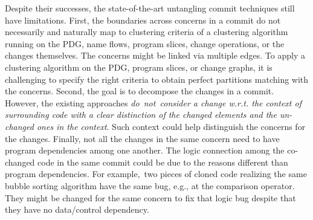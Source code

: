 

Despite their successes, the state-of-the-art untangling commit
techniques still have limitations. First, the boundaries across concerns in a commit do not necessarily and naturally map to
clustering criteria of a clustering algorithm running on the PDG, name
flows, program slices, change operations, or the changes
themselves. The concerns might be linked via multiple edges.
To apply a clustering algorithm on the PDG, program slices, or change
graphs, it is challenging to specify the right criteria to obtain
perfect partitions matching with the concerns.
%
Second, the goal is to decompose the changes in a commit. However, the
existing approaches {\em do~not~consider a change w.r.t. the context
  of surrounding code with a clear distinction of the changed elements
  and the un-changed ones in the context}. Such context could help
distinguish the concerns for the changes. Finally, not all the changes
in the same concern need to have program dependencies among one
another. The logic connection among the co-changed code in the same
commit could be due to the reasons different than program
dependencies. For example,~two pieces of cloned code realizing the
same bubble sorting algorithm have the same bug, e.g., at the
comparison operator. They might be changed for the same concern to fix
that logic bug despite that they have no data/control dependency.



